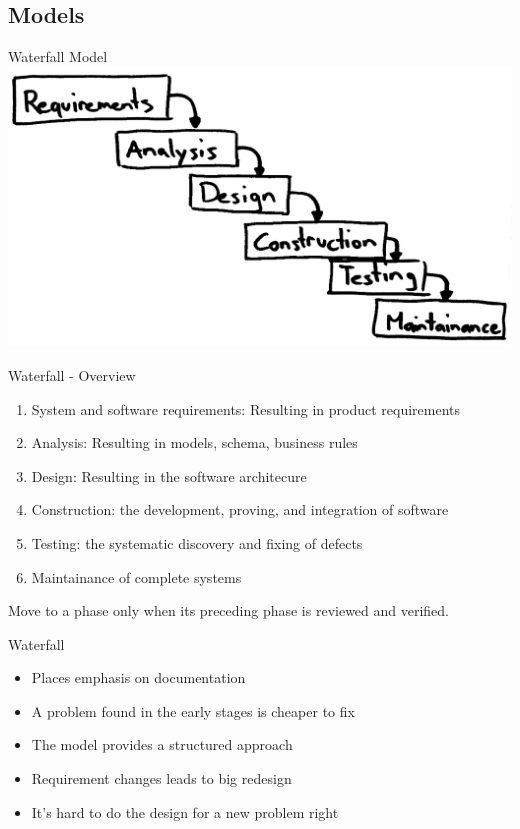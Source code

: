 \documentclass{beamer}
\begin{document}
\subsection{Models}

\begin{frame}{Waterfall Model}
\includegraphics[scale=0.3]{img/Waterfall.png}
\end{frame}

\begin{frame}{Waterfall - Overview}
\begin{enumerate}
  \item System and software requirements: Resulting in product requirements
  \item Analysis: Resulting in models, schema, business rules
  \item Design: Resulting in  the software architecure
  \item Construction: the development, proving, and integration of software
  \item Testing: the systematic discovery and fixing of defects
  \item Maintainance of complete systems
\end{enumerate}
Move to a phase only when its preceding phase is reviewed and verified.
\end{frame}

\begin{frame}{Waterfall}
\begin{itemize}
  \item Places emphasis on documentation
  \item A problem found in the early stages is cheaper to fix
  \item The model provides a structured approach
  \item Requirement changes leads to big redesign
  \item It's hard to do the design for a new problem right
\end{itemize}
\end{frame}
\end{document}
